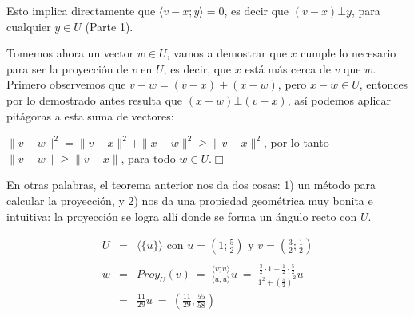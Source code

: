 \documentclass[12pt]{book}
\begin{document}
{{Esto implica directamente que $\langle v-x;y\rangle=0$, es decir que $(v-x)\bot y$, para cualquier $y\in U$ (Parte 1).
      
Tomemos ahora un vector $w\in U$, vamos a demostrar que $x$ cumple lo necesario para ser la proyección de $v$ en $U$, es decir, que $x$ está más cerca de $v$ que $w$.
Primero observemos que
      $v-w=(v-x)+(x-w)$, pero $x-w\in U$, entonces por lo demostrado antes resulta que $(x-w)\bot (v-x)$, así podemos aplicar pitágoras a esta suma de vectores:

      $\|v-w\|^2=\|v-x\|^2+\|x-w\|^2\ge \|v-x\|^2$, por lo tanto $\|v-w\|\ge \|v-x\|$, para todo $w\in U$.\hfill $\Box$
    }

En otras palabras, el teorema anterior nos da dos cosas: 1) un método para calcular la proyección, y 2) nos da una propiedad geométrica muy bonita e intuitiva: la proyección se logra allí donde se forma un ángulo recto con $U$.

\hspace{-.5cm}
\begin{minipage}{.5\textwidth}
\begin{center}
\end{center}
\end{minipage}
\begin{minipage}{.5\textwidth}
\begin{eqnarray*}
U&=&\langle\{u\}\rangle \textrm{ con } u=\left(1;\frac{5}{2}\right)\textrm{ y } v=\left(\frac{3}{2}; \frac{1}{2}\right)\\
\\
w&=&Proy_U(v)\ =\ \frac{\langle v;u\rangle}{\langle u;u\rangle}u\ =\ \frac{\frac{3}{2}\cdot1+\frac{1}{2}\cdot\frac{5}{2}}{1^2+\left(\frac{5}{2}\right)^2}u\\
&=&\frac{11}{29}u\ =\ \left(\frac{11}{29},\frac{55}{58}\right)
\end{eqnarray*}
\end{minipage}

}
\end{document}

